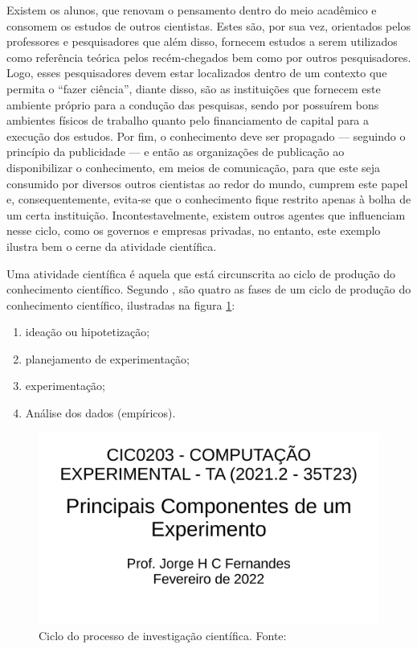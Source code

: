Existem os alunos, que renovam o pensamento dentro do meio acadêmico e consomem os estudos de outros cientistas. Estes são, por sua vez, orientados pelos professores e pesquisadores que além disso, fornecem estudos a serem utilizados como referência teórica pelos recém-chegados bem como por outros pesquisadores. Logo, esses pesquisadores devem estar localizados dentro de um contexto que permita o ``fazer ciência'', diante disso, são as instituições que fornecem este ambiente próprio para a condução das pesquisas, sendo por possuírem bons ambientes físicos de trabalho quanto pelo financiamento de capital para a execução dos estudos. Por fim, o conhecimento deve ser propagado --- seguindo o princípio da publicidade ---  e então as organizações de publicação ao disponibilizar o conhecimento, em meios de comunicação, para que este seja consumido por diversos outros cientistas ao redor do mundo, cumprem este papel e, consequentemente, evita-se que o conhecimento fique restrito apenas à bolha de um certa instituição. Incontestavelmente, existem outros agentes que influenciam nesse ciclo, como os governos e empresas privadas, no entanto, este exemplo ilustra bem o cerne da atividade científica.



Uma atividade científica é aquela que está circunscrita ao ciclo de produção do conhecimento científico. Segundo \cite[p.2]{barton_graphical_1999}, são quatro as fases de um ciclo de produção do conhecimento científico, ilustradas na figura \ref{fig:ciclo:barton}:
\begin{enumerate}
    \item ideação ou hipotetização; 
    \item  planejamento de experimentação;
    \item  experimentação;
    \item Análise dos dados (empíricos).
\end{enumerate}

\begin{figure}
    \centering
    \includegraphics[page=31,clip=true,width=\textwidth]{3-Computacao-Experimental/aulas/3.1-Componentes-Experimento/slides-experimentos.pdf}
    \caption{Ciclo do processo de investigação científica. Fonte: \cite{barton_graphical_1999}\label{fig:ciclo:barton}}
\end{figure}

